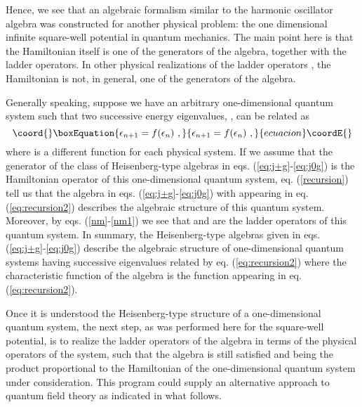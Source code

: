 \documentclass[a4paper,12pt]{article}
\begin{document}
Hence, we see that an algebraic formalism similar to 
the harmonic oscillator algebra was constructed for another 
physical problem: the one dimensional infinite square-well 
potential in quantum mechanics. The main point here is that 
the Hamiltonian itself is one of the generators of the algebra, 
together with the ladder operators. In other physical realizations 
of the ladder operators \cite{morse}, the Hamiltonian is not, 
in general, one of the generators of the algebra. 

Generally speaking, suppose we have
an arbitrary one-dimensional quantum system such that
two successive energy eigenvalues, \coordHE{}, can be 
related as 
\begin{equation}\coord{}\boxEquation{
\epsilon_{n+1} = f(\epsilon_{n}) \, \, ,
\label{eq:recursion2}
}{
\epsilon_{n+1} = f(\epsilon_{n}) \, \, ,
}{ecuacion}\coordE{}\end{equation} 
where 
\coordHE{} is a different function for each physical
system. If we assume that the generator \coordHE{} of 
the class of Heisenberg-type algebras in
eqs. (\ref{eq:j+g}-\ref{eq:j0g}) is the Hamiltonian
operator of this one-dimensional quantum system,
eq. (\ref{recursion}) tell us that the algebra
in eqs. (\ref{eq:j+g}-\ref{eq:j0g}) with \coordHE{} appearing
in eq. (\ref{eq:recursion2}) describes the algebraic
structure of this quantum system. Moreover, by 
eqs. (\ref{nm}-\ref{nm1}) we see that \coordHE{} and \coordHE{} 
are the ladder operators of this quantum system. 
In summary, the Heisenberg-type algebras  
\cite{algebra2} given in eqs. (\ref{eq:j+g}-\ref{eq:j0g})
describe the algebraic structure of one-dimensional
quantum systems having successive eigenvalues
related by eq. (\ref{eq:recursion2}) where the
characteristic function of the algebra is the function
\coordHE{} appearing in eq. (\ref{eq:recursion2}).

Once it is understood the Heisenberg-type structure
of a one-dimensional quantum system, the next step,
as was performed here for the square-well potential,
is to realize the ladder operators of the algebra
in terms of the physical operators of the system, such 
that the algebra 
is still satisfied and being the product \coordHE{} 
proportional to the Hamiltonian of the one-dimensional
quantum system under consideration.
This program could supply an alternative approach
to quantum field theory as indicated in what
follows.
\end{document}
